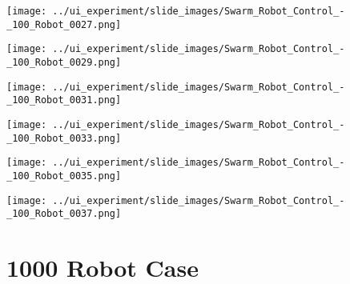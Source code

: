 \begin{minipage}{\linewidth}
	\centering
	\begin{minipage}{0.42\linewidth}
		\texttt{[image: ../ui\_experiment/slide\_images/Swarm\_Robot\_Control\_-\_100\_Robot\_0027.png]}
		\label{fig:sub2}
	\end{minipage}
	\hspace{0.05\linewidth}
	\begin{minipage}{0.42\linewidth}
		\texttt{[image: ../ui\_experiment/slide\_images/Swarm\_Robot\_Control\_-\_100\_Robot\_0029.png]}
		\label{fig:sub1}
	\end{minipage}
\end{minipage}

\begin{minipage}{\linewidth}
	\centering
	\begin{minipage}{0.42\linewidth}
		\texttt{[image: ../ui\_experiment/slide\_images/Swarm\_Robot\_Control\_-\_100\_Robot\_0031.png]}
		\label{fig:sub2}
	\end{minipage}
	\hspace{0.05\linewidth}
	\begin{minipage}{0.42\linewidth}
		\texttt{[image: ../ui\_experiment/slide\_images/Swarm\_Robot\_Control\_-\_100\_Robot\_0033.png]}
		\label{fig:sub1}
	\end{minipage}
\end{minipage}

\begin{minipage}{\linewidth}
	\centering	
	\begin{minipage}{0.42\linewidth}
		\texttt{[image: ../ui\_experiment/slide\_images/Swarm\_Robot\_Control\_-\_100\_Robot\_0035.png]}
		\label{fig:sub1}
	\end{minipage}
	\hspace{0.05\linewidth}
	\begin{minipage}{0.42\linewidth}
		\texttt{[image: ../ui\_experiment/slide\_images/Swarm\_Robot\_Control\_-\_100\_Robot\_0037.png]}
		\label{fig:sub2}
	\end{minipage}
	\label{fig:100_robot_slides}
\end{minipage}

\section{1000 Robot Case}

